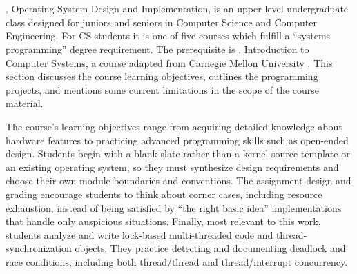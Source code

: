\section{\fourten}
\label{sec:410}

\fourten, Operating System Design and Implementation,
is an upper-level undergraduate class
designed for juniors and seniors in Computer Science
and Computer Engineering.
For CS students it is one of five courses which fulfill
a ``systems programming'' degree requirement.
%
The prerequisite is \twothirteen,
Introduction to Computer Systems,
a course adapted from Carnegie Mellon University %
\cite{sigcse01:CSaPP}.
This section discusses the course learning objectives,
outlines the programming projects,
and mentions some current limitations in the scope
of the course material.

The course's learning objectives
range from acquiring detailed knowledge about
hardware features
to practicing advanced programming skills %
such as open-ended design.
%
Students begin with a blank slate rather than a
kernel-source template or an existing operating system,
so they must synthesize design requirements %
and %
choose their own module boundaries and conventions.
%
The assignment design and grading encourage students to
think about corner cases, including resource exhaustion,
instead of being satisfied by
``the right basic idea''
implementations that handle only auspicious situations.
%
Finally, most relevant to this work,
students %
analyze and write lock-based multi-threaded code and
thread-synchronization objects.
They practice detecting and documenting deadlock and race conditions,
including both thread/thread
and thread/interrupt concurrency.


